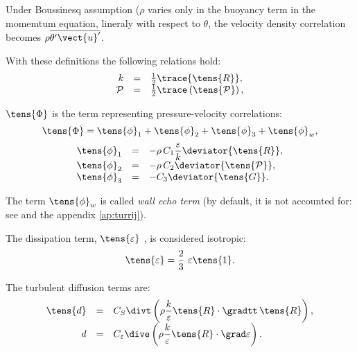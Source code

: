 \begin{remark}
Under Boussinesq assumption ($\rho$ varies only in the buoyancy term in the momemtum equation, lineraly with respect to $\theta$, the velocity density correlation becomes $\rho \overline{\theta^\prime \vect{u}^\prime}$.
\end{remark}

With these definitions the following relations hold:
\begin{equation}
\begin{array}{r c l}
\displaystyle k &=&\frac{1}{2} \trace{\tens{R}}, \\
\mathcal{P} &=&\frac{1}{2} \trace \left( \tens{\mathcal{P}} \right) ,
\end{array}
\end{equation}

$\tens{\Phi}$ is the term representing pressure-velocity correlations:
\begin{equation}
\displaystyle \tens{\Phi} = \tens{\phi}_{1}+ \tens{\phi}_{2}+ \tens{\phi}_{3}+ \tens{\phi}_{w},
\end{equation}%
%
\begin{equation}
\begin{array}{r c l}
\tens{\phi}_{1} &=& \displaystyle -\rho \,C_{1}\frac{\varepsilon }{k}%
\deviator{\tens{R}}, \\
\tens{\phi}_{2} &=& -\rho \,C_{2} 
\deviator{\tens{\mathcal{P}}}, \\
\tens{\phi}_{3} &=& -C_{3} \deviator{ \tens{G} }.
\end{array}
\end{equation}

The term $\tens{\phi}_{w}$ is called \emph{wall echo term} (by default, it is not
accounted for: see  and the appendix \ref{ap:turrij}).

The dissipation term, $\tens{\varepsilon}$ , is considered isotropic:
\begin{equation}
\displaystyle \tens{\varepsilon}=\frac{2}{3}\ \varepsilon \tens{1}.
\end{equation}

The turbulent diffusion terms are:
\begin{equation}
\begin{array}{r c l}
\tens{d} & = & C_{S} \displaystyle \divt \left( \rho \frac{k}{\varepsilon }%
\tens{R} \cdot \gradtt \, \tens{R} \right), \\
d & = & C_{\varepsilon }\displaystyle \dive \left( \rho \frac{k}{\varepsilon} 
\tens{R} \cdot \grad \varepsilon \right).
\end{array}
\end{equation}


